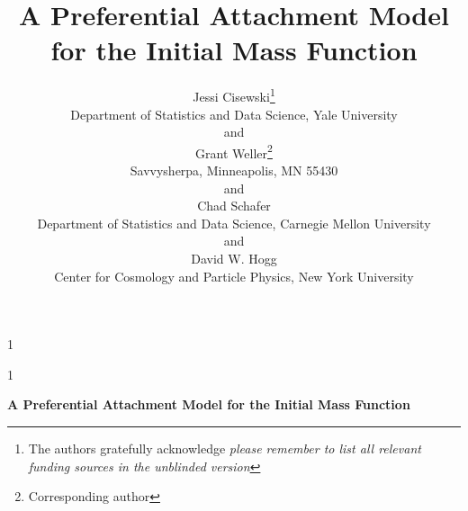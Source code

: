 \documentclass[12pt]{article}
\newcommand{\blind}{1}
\begin{document}
\def\spacingset#1{\renewcommand{\baselinestretch}%
{#1}\small\normalsize} \spacingset{1}





\blind
{
  \title{\bf A Preferential Attachment Model for the Initial Mass Function}
  \author{Jessi Cisewski\thanks{
    The authors gratefully acknowledge \textit{please remember to list all relevant funding sources in the unblinded version}}\hspace{.2cm}\\
    Department of Statistics and Data Science, Yale University\\
    and \\
    Grant Weller\thanks{
    Corresponding author}\hspace{.2cm}\\
  Savvysherpa, Minneapolis, MN 55430 \\
    and \\
    Chad Schafer \\
    Department of Statistics and Data Science, Carnegie Mellon University \\
        and \\
    David W. Hogg \\
    Center for Cosmology and Particle Physics, New York University 
    }
  \maketitle
} \fi

\blind
{
  \bigskip
  \bigskip
  \bigskip
  \begin{center}
    {\LARGE\bf A Preferential Attachment Model for the Initial Mass Function}
\end{center}
  \medskip
} \fi
\end{document}
